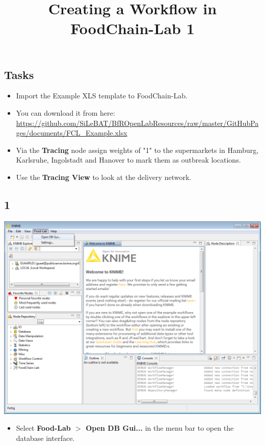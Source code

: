 \documentclass{beamer}
\title{Creating a Workflow in FoodChain-Lab 1}
\date{}
\begin{document}
\maketitle

\section{ }

\subsection{Tasks}
\begin{frame}
	\begin{itemize}
		\item Import the Example XLS template to FoodChain-Lab.
		\item You can download it from here: \url{https://github.com/SiLeBAT/BfROpenLabResources/raw/master/GitHubPages/documents/FCL_Example.xlsx}
		\item Via the \textbf{Tracing} node assign weights of "1" to the supermarkets in Hamburg, Karlsruhe, Ingolstadt and Hanover to mark them as outbreak locations.
		\item Use the \textbf{Tracing View} to look at the delivery network.
	\end{itemize}
\end{frame}
 
\subsection{1}
\begin{frame}
	\begin{center}
  		\includegraphics[height=0.6\textheight]{1.png}
	\end{center}
	\begin{itemize}
		\item Select \textbf{Food-Lab $>$ Open DB Gui...} in the menu bar to open the database interface.
	\end{itemize}
\end{frame}
\end{document}
